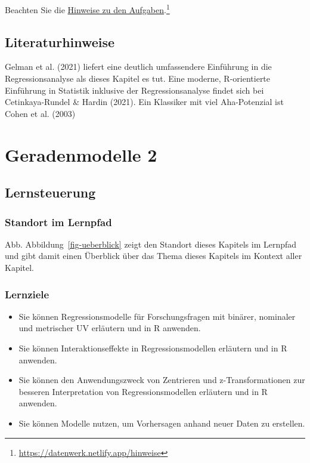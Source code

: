 \documentclass[
  letterpaper,
]{scrbook}
\providecommand{\tightlist}{%
  \setlength{\itemsep}{0pt}\setlength{\parskip}{0pt}}\usepackage{longtable,booktabs,array}
\theoremstyle{definition}
\theoremstyle{definition}
\theoremstyle{definition}
\theoremstyle{remark}
\begin{document}
Beachten Sie die \href{https://datenwerk.netlify.app/hinweise}{Hinweise
zu den Aufgaben}.\footnote{\url{https://datenwerk.netlify.app/hinweise}}

\section{Literaturhinweise}\label{literaturhinweise-7}

Gelman et al. (2021) liefert eine deutlich umfassendere Einführung in
die Regressionsanalyse als dieses Kapitel es tut. Eine moderne,
R-orientierte Einführung in Statistik inklusive der Regressionsanalyse
findet sich bei Cetinkaya-Rundel \& Hardin (2021). Ein Klassiker mit
viel Aha-Potenzial ist Cohen et al. (2003)

\chapter{Geradenmodelle 2}\label{geradenmodelle-2}

\section{Lernsteuerung}\label{lernsteuerung-8}

\subsection{Standort im Lernpfad}\label{standort-im-lernpfad-1}

Abb. Abbildung~\ref{fig-ueberblick} zeigt den Standort dieses Kapitels
im Lernpfad und gibt damit einen Überblick über das Thema dieses
Kapitels im Kontext aller Kapitel.

\subsection{Lernziele}\label{lernziele-9}

\begin{itemize}
\tightlist
\item
  Sie können Regressionsmodelle für Forschungsfragen mit binärer,
  nominaler und metrischer UV erläutern und in R anwenden.
\item
  Sie können Interaktionseffekte in Regressionsmodellen erläutern und in
  R anwenden.
\item
  Sie können den Anwendungszweck von Zentrieren und z-Transformationen
  zur besseren Interpretation von Regressionsmodellen erläutern und in R
  anwenden.
\item
  Sie können Modelle nutzen, um Vorhersagen anhand neuer Daten zu
  erstellen.
\end{itemize}
\end{document}
